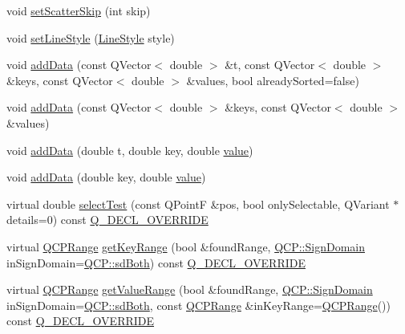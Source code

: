 \begin{DoxyCompactItemize}
\item 
void \mbox{\hyperlink{class_q_c_p_curve_a97dbfecd497e972d5f2162615e6da5be}{set\+Scatter\+Skip}} (int skip)
\item 
void \mbox{\hyperlink{class_q_c_p_curve_a4a377ec863ff81a1875c3094a6177c19}{set\+Line\+Style}} (\mbox{\hyperlink{class_q_c_p_curve_a2710e9f79302152cff794c6e16cc01f1}{Line\+Style}} style)
\item 
void \mbox{\hyperlink{class_q_c_p_curve_a73edf394b94f3f24f07518e30565a07f}{add\+Data}} (const Q\+Vector$<$ double $>$ \&t, const Q\+Vector$<$ double $>$ \&keys, const Q\+Vector$<$ double $>$ \&values, bool already\+Sorted=false)
\item 
void \mbox{\hyperlink{class_q_c_p_curve_a6424fa06da1786648c83ad13a0d0aa14}{add\+Data}} (const Q\+Vector$<$ double $>$ \&keys, const Q\+Vector$<$ double $>$ \&values)
\item 
void \mbox{\hyperlink{class_q_c_p_curve_a13398b236f6926014e404eeb5b9f415c}{add\+Data}} (double t, double key, double \mbox{\hyperlink{diffusion_8cpp_a4b41795815d9f3d03abfc739e666d5da}{value}})
\item 
void \mbox{\hyperlink{class_q_c_p_curve_ada4762e793cd5707b33f35b8a4b0f8fb}{add\+Data}} (double key, double \mbox{\hyperlink{diffusion_8cpp_a4b41795815d9f3d03abfc739e666d5da}{value}})
\item 
virtual double \mbox{\hyperlink{class_q_c_p_curve_a0ed9b7e6b4bc72010d6fcd974af46a8b}{select\+Test}} (const Q\+PointF \&pos, bool only\+Selectable, Q\+Variant $\ast$details=0) const \mbox{\hyperlink{qcustomplot_8h_a42cc5eaeb25b85f8b52d2a4b94c56f55}{Q\+\_\+\+D\+E\+C\+L\+\_\+\+O\+V\+E\+R\+R\+I\+DE}}
\item 
virtual \mbox{\hyperlink{class_q_c_p_range}{Q\+C\+P\+Range}} \mbox{\hyperlink{class_q_c_p_curve_a22d09087f78f254731197cc0b8783299}{get\+Key\+Range}} (bool \&found\+Range, \mbox{\hyperlink{namespace_q_c_p_afd50e7cf431af385614987d8553ff8a9}{Q\+C\+P\+::\+Sign\+Domain}} in\+Sign\+Domain=\mbox{\hyperlink{namespace_q_c_p_afd50e7cf431af385614987d8553ff8a9aa38352ef02d51ddfa4399d9551566e24}{Q\+C\+P\+::sd\+Both}}) const \mbox{\hyperlink{qcustomplot_8h_a42cc5eaeb25b85f8b52d2a4b94c56f55}{Q\+\_\+\+D\+E\+C\+L\+\_\+\+O\+V\+E\+R\+R\+I\+DE}}
\item 
virtual \mbox{\hyperlink{class_q_c_p_range}{Q\+C\+P\+Range}} \mbox{\hyperlink{class_q_c_p_curve_a8bb8e3b9085f15921dc40483fb025ab2}{get\+Value\+Range}} (bool \&found\+Range, \mbox{\hyperlink{namespace_q_c_p_afd50e7cf431af385614987d8553ff8a9}{Q\+C\+P\+::\+Sign\+Domain}} in\+Sign\+Domain=\mbox{\hyperlink{namespace_q_c_p_afd50e7cf431af385614987d8553ff8a9aa38352ef02d51ddfa4399d9551566e24}{Q\+C\+P\+::sd\+Both}}, const \mbox{\hyperlink{class_q_c_p_range}{Q\+C\+P\+Range}} \&in\+Key\+Range=\mbox{\hyperlink{class_q_c_p_range}{Q\+C\+P\+Range}}()) const \mbox{\hyperlink{qcustomplot_8h_a42cc5eaeb25b85f8b52d2a4b94c56f55}{Q\+\_\+\+D\+E\+C\+L\+\_\+\+O\+V\+E\+R\+R\+I\+DE}}
\end{DoxyCompactItemize}
